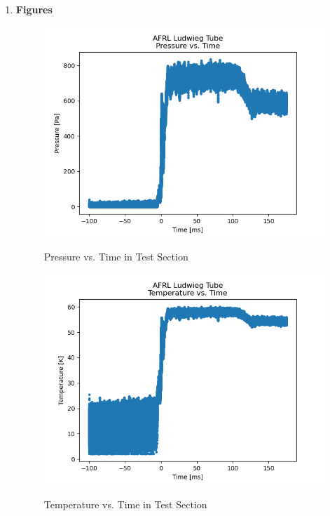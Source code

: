 \documentclass[12pt,letterpaper]{article}
\begin{document}
\begin{enumerate}[label=(\alph*)]
\begin{enumerate}[label=\arabic*.]
			\newpage	
			\item{\textbf{Figures}}\\

			\begin{figure}[h]
				\centering
				\includegraphics[scale=0.7]{pressure_vs_time}
				\label{Pressure_vs_Time}
				\caption{Pressure vs. Time in Test Section}
			\end{figure}

			\begin{figure}[h]
				\centering
				\includegraphics[scale=0.7]{temperature_vs_time}
				\label{Temperature_vs_Time}
				\caption{Temperature vs. Time in Test Section}
			\end{figure}


\end{enumerate}
\end{enumerate}
\end{document}
